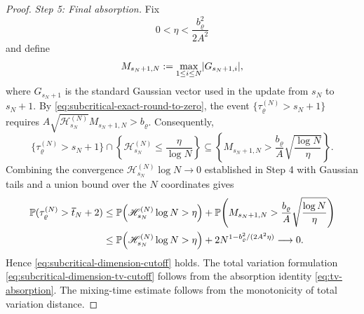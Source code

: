 \documentclass[11pt,reqno,a4paper]{article}
\newcommand{\Pp}{\P}
\begin{document}
\begin{proof}
  \emph{Step 5: Final absorption.}
  Fix
  \begin{equation*}
    0<\eta<\frac{b_\varrho^2}{2A^2}
  \end{equation*}
  and define
  \begin{equation*}
    M_{s_N+1,N}
    :=
    \max_{1\leq i\leq N}\abs{G_{s_N+1,i}},
  \end{equation*}
  where $G_{s_N+1}$ is the standard Gaussian vector used in the update from
  $s_N$ to $s_N+1$. By \cref{eq:subcritical-exact-round-to-zero}, the event
  $\{\tau_{\varrho}^{(N)}>s_N+1\}$ requires
  $A\sqrt{\mathscr H_{s_N}^{(N)}}M_{s_N+1,N}>b_\varrho$. Consequently,
  \begin{equation*}
    \{\tau_{\varrho}^{(N)}>s_N+1\}
    \cap
    \left\{\mathscr H_{s_N}^{(N)}\leq\frac{\eta}{\log N}\right\}
    \subseteq
    \left\{
      M_{s_N+1,N}>
      \frac{b_\varrho}{A}
      \sqrt{\frac{\log N}{\eta}}
    \right\}.
  \end{equation*}
  Combining the convergence
  $\mathscr H_{s_N}^{(N)}\log N\to0$ established in Step 4 with Gaussian tails
  and a union bound over the $N$ coordinates gives
  \begin{align*}
    \Pp(\tau_{\varrho}^{(N)}>\bar t_N+2)
    &\leq
    \Pp\left(
      \mathscr H_{s_N}^{(N)}\log N>\eta
    \right)
    +
    \Pp\left(
      M_{s_N+1,N}>
      \frac{b_\varrho}{A}
      \sqrt{\frac{\log N}{\eta}}
    \right)
    \\
    &\leq
    \Pp\left(
      \mathscr H_{s_N}^{(N)}\log N>\eta
    \right)
    +
    2N^{1-b_\varrho^2/(2A^2\eta)}
    \longrightarrow0.
  \end{align*}
  Hence \cref{eq:subcritical-dimension-cutoff} holds. The total variation formulation
  \cref{eq:subcritical-dimension-tv-cutoff} follows from the absorption
  identity \cref{eq:tv-absorption}. The mixing-time estimate follows from the
  monotonicity of total variation distance.
\end{proof}
\end{document}
